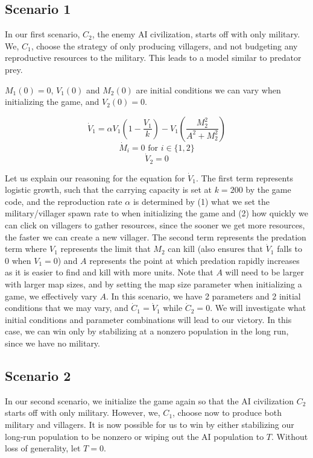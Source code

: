 \documentclass[12pt]{article}
\begin{document}
\subsection{Scenario 1}

In our first scenario, $C_2$, the enemy AI civilization, starts off with only military. We, $C_1$, choose the strategy of only producing villagers, and not budgeting any reproductive resources to the military. This leads to a model similar to predator prey. \par

$M_1(0) = 0$, $V_1(0)$ and $M_2(0)$ are initial conditions we can vary when initializing the game, and $V_2(0) = 0$.

$$\dot V_1=\alpha V_1(1-\frac{V_1}{k})-V_1(\frac{M_2^2}{A^2+M_2^2})$$
$$ \dot M_i = 0 \text{ for } i \in \{1, 2\} $$
$$\dot V_2 = 0$$

Let us explain our reasoning for the equation for $\dot V_1$. The first term represents logistic growth, such that the carrying capacity is set at $k=200$ by the game code, and the reproduction rate $\alpha$ is determined by (1) what we set the military/villager spawn rate to when initializing the game and (2) how quickly we can click on villagers to gather resources, since the sooner we get more resources, the faster we can create a new villager. The second term represents the predation term where $V_1$ represents the limit that $M_2$ can kill (also ensures that $\dot V_1$ falls to 0 when $V_1 = 0$) and $A$ represents the point at which predation rapidly increases as it is easier to find and kill with more units. Note that $A$ will need to be larger with larger map sizes, and by setting the map size parameter when initializing a game, we effectively vary $A$. In this scenario, we have 2 parameters and 2 initial conditions that we may vary, and $\dot C_1 = \dot V_1$ while $\dot C_2 = 0$. We will investigate what initial conditions and parameter combinations will lead to our victory. In this case, we can win only by stabilizing at a nonzero population in the long run, since we have no military.


\subsection{Scenario 2}

In our second scenario, we initialize the game again so that the AI civilization $C_2$ starts off with only military. However, we, $C_1$, choose now to produce both military and villagers. It is now possible for us to win by either stabilizing our long-run population to be nonzero or wiping out the AI population to $T$. Without loss of generality, let $T = 0$. \par
\end{document}
